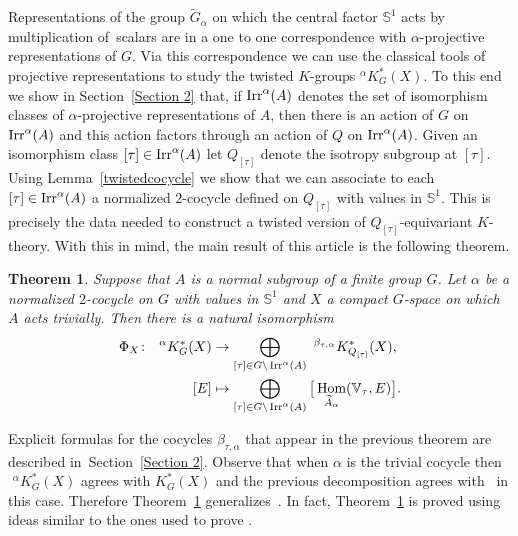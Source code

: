\documentclass[10pt,a4paper]{amsart}
\def\S{\mathbb{S}}
\def\V{\mathbb{V}}
\DeclareMathOperator{\Hom}{\textup{Hom}}
\DeclareMathOperator{\Irr}{\textup{Irr}}
\newtheorem{Th}{Theorem}[section]
\theoremstyle{definition}
\numberwithin{equation}{section}
\begin{document}
Representations of the group
$\widetilde{G}_{\alpha}$ on which the central factor $\S^{1}$
acts by multiplication of~sca\-lars are in a one to one correspondence
with $\alpha$-projective representations of $G$. Via this correspondence we can use
the classical tools of projective representations to study the twisted $K$-groups
$^{\alpha}K^{\ast}_{G}(X)$. To this end we show in Section~\ref{Section 2} that,
if $\Irr^{\alpha}(A)$ denotes the set of isomorphism classes of $\alpha$-projective
representations of $A$, then there is an action of $G$ on $\Irr^{\alpha}(A)$
and this action factors through an action of $Q$ on $\Irr^{\alpha}(A)$.
Given an isomorphism class $[\tau]\in \Irr^{\alpha}(A)$ let
$Q_{[\tau]}$ denote the isotropy subgroup at $[\tau]$. Using Lemma~\ref{twistedcocycle}
we show that we can associate to each $[\tau]\in \Irr^{\alpha}(A)$
a normalized $2$-cocycle defined on $Q_{[\tau]}$ with values in $\S^{1}$. This is
precisely the data needed to construct a twisted version of $Q_{[\tau]}$-equivariant
$K$-theory. With this in mind, the main result of this article is the following theorem.

\begin{Th}\label{main}
Suppose that $A$ is a normal subgroup of a finite group $G$. Let $\alpha$
be a normalized $2$-cocycle on $G$ with values in $\S^{1}$ and $X$ a
compact $G$-space on which $A$ acts trivially.
Then there is a natural isomorphism
\begin{align*}
\Phi_{X}\colon \ \phantom{i}^{\alpha}K_{G}^{\ast}(X)&\rightarrow
\bigoplus_{[\tau]\in G\backslash \Irr^{\alpha}(A)}\phantom{i}
^{\beta_{\tau,\alpha}}K^{\ast}_{Q_{[\tau]}}(X),
\\
[E]&\mapsto \bigoplus_{[\tau]\in G\backslash \Irr^{\alpha}(A)}
\big[\Hom_{\widetilde{A}_{\alpha}}(\V_{\tau},E)\big].
\end{align*}
\end{Th}

Explicit formulas for the cocycles $\beta_{\tau,\alpha}$ that appear in the previous theorem
are described in~Section~\ref{Section 2}. Observe that when $\alpha$ is the trivial cocycle
then $\phantom{i}^{\alpha}K_{G}^{\ast}(X)$ agrees
with $K_{G}^{*}(X)$ and the previous decomposition agrees with~\cite[Theorem 3.2]{GomezUribe}
in this case. Therefore Theorem~\ref{main} generalizes~\cite[Theorem 3.2]{GomezUribe}. In fact,
Theorem~\ref{main} is proved using ideas similar to the ones used to prove
\cite[Theorem 3.2]{GomezUribe}.
\end{document}
